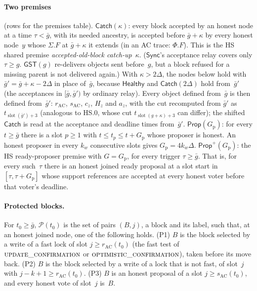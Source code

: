 \documentclass{article}
\newcommand{\slot}{\operatorname{slot}}
\newcommand{\Fr}{\Phi}
\newcommand{\fname}[1]{\text{\textsc{#1}}}
\begin{document}
\paragraph{Two premises} (rows for the premises table).
$\mathsf{Catch}(\kappa)$: every block accepted by an honest node at a time
$\tau<\bar g$, with its needed ancestry, is accepted before $\bar g+\kappa$
by every honest node~$y$ whose $\Sigma.F$ at $\bar g+\kappa$ it extends (in an
AC trace: $\Fr.F$).  This is the HS shared premise
\emph{accepted-old-block catch-up}~$\kappa$.  ($\mathsf{Sync}$'s acceptance
relay covers only $\tau\geq g$.  $\mathsf{GST}(g)$ re-delivers objects sent
before~$g$, but a block refused for a missing parent is not delivered again.)
With $\kappa>2\Delta$, the nodes below hold with
$\bar g'=\bar g+\kappa-2\Delta$ in place of~$\bar g$, because
$\mathsf{Healthy}$ and $\mathsf{Catch}(2\Delta)$ hold from~$\bar g'$ (the
acceptances in $[\bar g,\bar g')$ by ordinary relay).  Every object defined
from~$\bar g$ is then defined from~$\bar g'$: $r_{\mathrm{AC}}$,
$s_{\mathrm{AC}}$, $c_z$, $H_z$ and $a_z$, with the cut recomputed from
$\bar g'$ as $t_{\slot(\bar g')+3}$ (analogous to HS.0, whose cut
$t_{\slot(g+\kappa)+3}$ can differ); the shifted $\mathsf{Catch}$ is read at
the acceptance and deadline times from~$\bar g'$.
$\mathsf{Prop}(G_{\mathrm p})$: for every $t\geq\bar g$ there is a slot
$p\geq1$ with $t\leq t_p\leq t+G_{\mathrm p}$ whose proposer is honest.  An
honest proposer in every $k_w$ consecutive slots gives
$G_{\mathrm p}=4k_w\Delta$.
$\mathsf{Prop}^{+}(G_{\mathrm p})$: the HS ready-proposer premise with
$G=G_{\mathrm p}$, for every trigger $\tau\geq\bar g$.  That is, for every
such~$\tau$ there is an honest joined ready proposal at a slot start in
$[\tau,\tau+G_{\mathrm p}]$ whose support references are accepted at every
honest voter before that voter's deadline.

\paragraph{Protected blocks.}  For $t_0\geq\bar g$, $\mathcal P(t_0)$ is the
set of pairs $(B,j)$, a block and its label, such that, at an honest joined
node, one of the following holds.
(P1) $B$ is the block selected by a write of a fast lock of slot
$j\geq r_{\mathrm{AC}}(t_0)$ (the fast test of
$\fname{update\_confirmation}$ or $\fname{optimistic\_confirmation}$), taken
before its move back.
(P2) $B$ is the block selected by a write of a lock that is not fast, of
slot~$j$ with $j-k+1\geq r_{\mathrm{AC}}(t_0)$.
(P3) $B$ is an honest proposal of a slot $j\geq s_{\mathrm{AC}}(t_0)$, and
every honest vote of slot~$j$ is~$B$.
\end{document}
